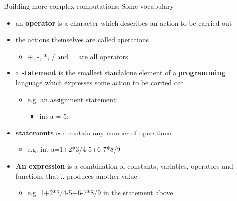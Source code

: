 \documentclass{beamer}
\begin{document}
\begin{frame}
Building more complex computations: Some vocabulary
\begin{itemize}
\item an \textbf{operator} is a character which describes an action to be carried out
\item the actions themselves are called operations
\begin{itemize}
\item +, -, *, / and = are all operators
\bigskip
\end{itemize}
\item \textcolor[rgb]{0.13333334,0.13333334,0.13333334}{a
}\textbf{\textcolor[rgb]{0.13333334,0.13333334,0.13333334}{statement
}}\textcolor[rgb]{0.13333334,0.13333334,0.13333334}{is the smallest standalone element of a
}\textbf{\textcolor[rgb]{0.13333334,0.13333334,0.13333334}{programming
}}\textcolor[rgb]{0.13333334,0.13333334,0.13333334}{language which expresses some action to be carried out
}\textcolor[rgb]{0.13333334,0.13333334,0.13333334}{}
\begin{itemize}
\item \textcolor[rgb]{0.13333334,0.13333334,0.13333334}{e.g. }\textcolor[rgb]{0.13333334,0.13333334,0.13333334}{an
assignment statement:}
\begin{itemize}
\item {\color[rgb]{0.13333334,0.13333334,0.13333334}
int a = 5;}
\end{itemize}
\end{itemize}
\item \textbf{statements} can contain any number of operations 
\begin{itemize}
\item e.g. int a=1+2*3/4-5+6-7*8/9
\end{itemize}
\bigskip
\item \textbf{An expression} is a combination of constants, variables, operators and functions that .. produces another value
\begin{itemize}
\item e.g. 1+2*3/4-5+6-7*8/9 in the statement above.
\end{itemize}
\end{itemize}
\end{frame}
\end{document}

